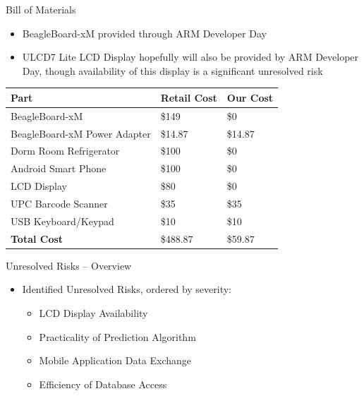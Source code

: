 \documentclass[t]{beamer}
\begin{document}
\begin{frame}{Bill of Materials}
\begin{itemize}
\item BeagleBoard-xM provided through ARM Developer Day
\item ULCD7 Lite LCD Display hopefully will also be provided by ARM Developer Day,  though availability of this display is a significant unresolved risk
\end{itemize}
\vspace{.5cm}
\footnotesize
\begin{center}
\begin{tabular}{| p{2.0in} | p{.75in} |p{.75in} |}
\hline
Part & Retail Cost & Our Cost \\
\hline
BeagleBoard-xM & \$149 & \$0 \\
\hline
BeagleBoard-xM Power Adapter & \$14.87 & \$14.87 \\
\hline
Dorm Room Refrigerator & \$100 & \$0 \\
\hline
Android Smart Phone & \$100 & \$0  \\
\hline
LCD Display & \$80  & \$0 \\
\hline
UPC Barcode Scanner & \$35 & \$35 \\
\hline
USB Keyboard/Keypad & \$10 & \$10 \\
\hline
\hline
\textbf{Total Cost} & \$488.87 & \$59.87 \\
\hline
\end{tabular}
\end{center}
\end{frame}

\begin{frame}{Unresolved Risks -- Overview}
\begin{itemize}
\item Identified Unresolved Risks, ordered by severity:
\begin{itemize}
\item LCD Display Availability
\item Practicality of Prediction Algorithm
\item Mobile Application Data Exchange
\item Efficiency of Database Access
\end{itemize}
\end{itemize}
\end{frame}
\end{document}
